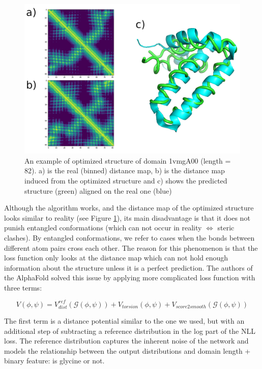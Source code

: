 \begin{figure}
    \centering
    \includegraphics[width=0.8\linewidth]{imgs_tomas/1vmg_ensemble.png}
    \caption{An example of optimized structure of domain 1vmgA00 (length = 82). a) is the real (binned) distance map, b) is the distance map induced from the optimized structure and c) shows the predicted structure (green) aligned on the real one (blue)}
    \label{fig:1vmg}
\end{figure}

Although the algorithm works, and the distance map of the optimized structure looks similar to reality (see Figure \ref{fig:1vmg}), its main disadvantage is that it does not punish entangled conformations (which can not occur in reality $\Leftrightarrow$ steric clashes). By entangled conformations, we refer to cases when the bonds between different atom pairs cross each other. The reason for this phenomenon is that the loss function only looks at the distance map which can not hold enough information about the structure unless it is a perfect prediction. The authors of the AlphaFold solved this issue by applying more complicated loss function with three terms:

\begin{equation}
    V(\phi, \psi) = V_{dist}^{ref}(\mathcal{G}(\phi, \psi)) + V_{torsion}(\phi, \psi) + V_{score2smooth}(\mathcal{G}(\phi, \psi))
    \label{eq:alphafold_potential}
\end{equation}

The first term is a distance potential similar to the one we used, but with an additional step of subtracting a reference distribution in the log part of the NLL loss. The reference distribution captures the inherent noise of the network and models the relationship between the output distributions and domain length + binary feature: is glycine or not.


